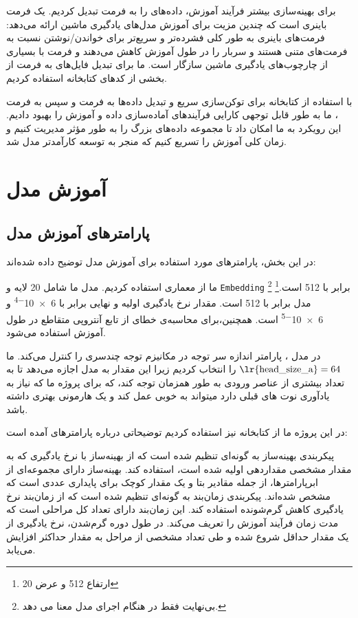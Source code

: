برای بهینه‌سازی بیشتر فرآیند آموزش، داده‌های  را به فرمت  تبدیل کردیم.  یک فرمت باینری است که چندین مزیت برای آموزش مدل‌های یادگیری ماشین ارائه می‌دهد: فرمت‌های باینری به طور کلی فشرده‌تر و سریع‌تر برای خواندن/نوشتن نسبت به فرمت‌های متنی هستند و سربار  را در طول آموزش کاهش می‌دهند و فرمت  با بسیاری از چارچوب‌های یادگیری ماشین سازگار است. ما برای تبدیل فایل‌های  به فرمت  از بخشی از کدهای کتابخانه  \cite{gpt-neox-library} استفاده کردیم.

با استفاده از کتابخانه  برای توکن‌سازی سریع و تبدیل داده‌ها به
فرمت  و سپس به فرمت ، ما به طور قابل توجهی کارایی فرآیندهای
آماده‌سازی داده و آموزش را بهبود دادیم. این رویکرد به ما امکان داد تا
مجموعه داده‌های بزرگ را به طور مؤثر مدیریت کنیم و زمان کلی آموزش را تسریع
کنیم که منجر به توسعه کارآمدتر مدل شد.

\section{آموزش مدل}
\subsection{پارامترهای آموزش مدل}
در این بخش، پارامترهای مورد استفاده برای آموزش مدل توضیح داده شده‌اند:

ما از معماری  \cite{peng2024eagle} استفاده کردیم. مدل ما شامل 20 لایه و
\texttt{Embedding} برابر با 512 است.\footnote{ارتفاع 512 و عرض 20}  \footnote{ بی‌نهایت فقط در هنگام اجرای مدل معنا می  دهد.} مدل برابر با
512 است.
مقدار نرخ یادگیری اولیه و نهایی برابر با \num{6e-4} و \num{6e-5} است. همچنین،برای محاسبه‌ی خطای از تابع آنتروپی متقاطع  در طول آموزش استفاده می‌شود.


در مدل ، پارامتر  اندازه سر توجه در مکانیزم توجه چندسری  را کنترل می‌کند. ما $\text{\lr{head\_size\_a}}=64$ را انتخاب کردیم زیرا این مقدار به مدل اجازه می‌دهد تا به تعداد بیشتری از عناصر ورودی به طور همزمان توجه کند، که برای پروژه ما که نیاز به یادآوری نوت های قبلی دارد میتواند به خوبی عمل کند و یک هارمونی بهتری داشته باشد.

در این پروژه ما از کتابخانه  نیز استفاده کردیم توضیحاتی درباره پارامترهای  آمده است:

پیکربندی بهینه‌ساز به گونه‌ای تنظیم شده است که از بهینه‌ساز  با نرخ یادگیری که به مقدار مشخصی مقداردهی اولیه شده است، استفاده کند. بهینه‌ساز  دارای مجموعه‌ای از ابرپارامترها، از جمله مقادیر بتا و یک مقدار کوچک برای پایداری عددی است که مشخص شده‌اند.
پیکربندی زمان‌بند به گونه‌ای تنظیم شده است که از زمان‌بند نرخ یادگیری کاهش گرم‌شونده استفاده کند. این زمان‌بند دارای تعداد کل مراحلی است که مدت زمان فرآیند آموزش را تعریف می‌کند. در طول دوره گرم‌شدن، نرخ یادگیری از یک مقدار حداقل شروع شده و طی تعداد مشخصی از مراحل به مقدار حداکثر افزایش می‌یابد.

